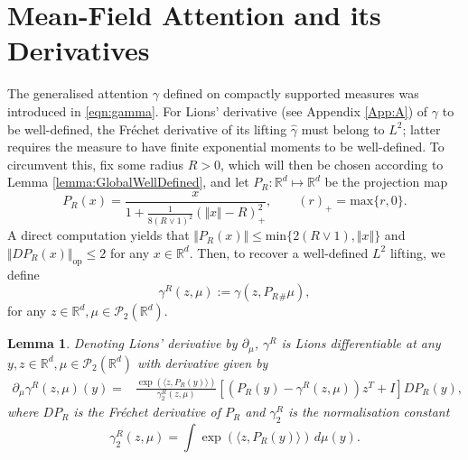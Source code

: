 \documentclass{article}
\newtheorem{lemma}[theorem]{Lemma}
\newcommand{\R}{\mathbb{R}}
\begin{document}
\section{Mean-Field Attention and its Derivatives}\label{sec:MFA}
The generalised attention $\gamma$ defined on compactly supported measures was introduced in \eqref{eqn:gamma}.
For Lions' derivative (see Appendix \ref{App:A}) of $\gamma$ to be well-defined, the Fr\'echet derivative of its lifting $\hat {\gamma}$ must belong to $L^2$; latter requires the measure to have finite exponential moments to be well-defined. To circumvent this, fix some radius  $R>0$, which will then be chosen according to Lemma \ref{lemma:GlobalWellDefined}, and let $P_R: \R^d\mapsto \R^d$ be the projection map
\begin{equation}\label{eqn:proj_map}
    P_R(x) = \frac{x}{1+\frac{1}{8(R\vee 1)^2}(\Vert x\Vert-R)_+^2}, \qquad (r)_+=\mathrm{max}\{r,0\}.
\end{equation}
A direct computation yields that $\Vert P_R(x)\Vert \le \mathrm{min}\{2(R\vee 1), \Vert x\Vert\}$ and $\Vert DP_R(x)\Vert_\mathrm{op}\le 2$ for any $x \in \R^d$. Then, to recover a well-defined $L^2$ lifting, we define
\begin{equation}\label{eqn:gammaExt}
    \gamma^R(z,\mu) := \gamma(z,P_R{}_\#\mu),
\end{equation}
for any $z\in \R^d,\mu\in \mathcal P_2(\R^d)$. 
\begin{lemma}\label{lemma:Lderivative}
Denoting Lions' derivative by $\partial_{\mu}$, $\gamma^R$ is Lions differentiable at any $y,z\in \R^d,\mu \in \mathcal{P}_2(\mathbb{R}^d)$ with derivative given by
    \begin{align*}
        \partial_{\mu} \gamma^R(z,\mu)(y) = &\frac{\exp(\langle z,P_R(y)\rangle)}{\gamma^R_{2}(z,\mu)} \left[(P_R(y)-\gamma^R(z,\mu))z^T+I \right]D P_R(y),
    \end{align*}
    where $DP_R$ is the Fr\'echet derivative of $P_R$ and $\gamma_2^R$ is the normalisation constant
    \begin{equation}\label{eqn:Z}
    \gamma_{2}^R(z,\mu) = \int \exp(\langle z, P_R(y)\rangle) \,d\mu(y).
\end{equation}
\end{lemma}
\end{document}
